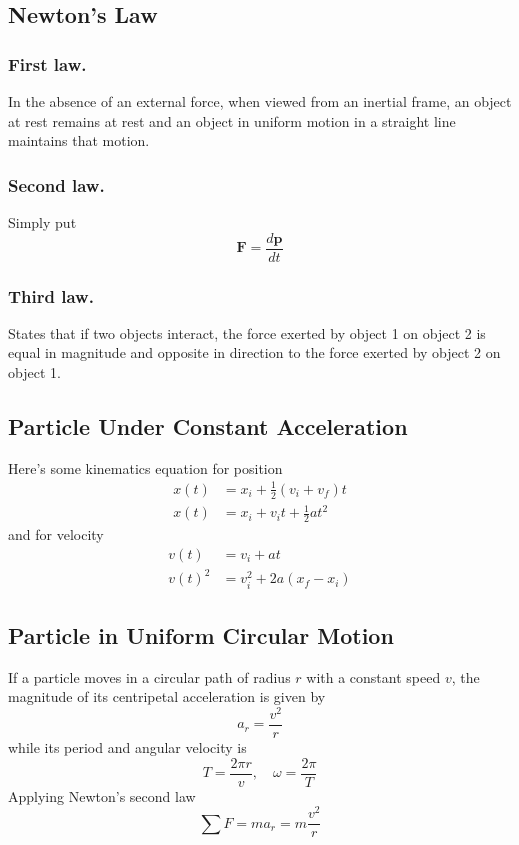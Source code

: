 \documentclass[../../../main.tex]{subfiles}
\begin{document}
\subsection{Newton's Law}
\subsubsection{First law.} In the absence of an external force, when viewed from an inertial frame, an object at rest remains at rest and an object in uniform motion in a straight line maintains that motion.

\subsubsection{Second law.} Simply put 
\begin{equation*}
    \mathbf{F}=\frac{d\mathbf{p}}{dt}
\end{equation*}

\subsubsection{Third law.} States that if two objects interact, the force exerted by object 1 on object 2 is equal in magnitude and opposite in direction to the force exerted by object 2 on object 1.

\subsection{Particle Under Constant Acceleration}
Here's some kinematics equation for position
\begin{align*}
    x(t)&=x_i+\frac{1}{2}(v_i+v_f)t\\
    x(t)&=x_i+v_it+\frac{1}{2}at^2
\end{align*}
and for velocity
\begin{align*}
    v(t)&=v_i+at\\
    v(t)^2&=v_i^2+2a(x_f-x_i)
\end{align*}

\subsection{Particle in Uniform Circular Motion}
If a particle moves in a circular path of radius $r$ with a constant speed $v$, the magnitude of its centripetal acceleration is given by
\begin{equation*}
    a_r=\frac{v^2}{r}
\end{equation*}
while its period and angular velocity is 
\begin{equation*}
    T=\frac{2\pi r}{v},\quad \omega=\frac{2\pi}{T}
\end{equation*}
Applying Newton's second law 
\begin{equation*}
    \sum F=ma_r=m\frac{v^2}{r}
\end{equation*}
\end{document}
